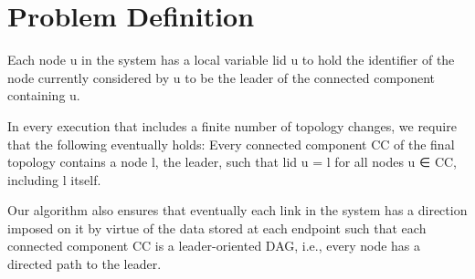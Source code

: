 \section{Problem Definition}
Each node u in the system has a local variable lid u to hold the identifier of the node currently considered by u to be the leader of the connected component containing u.

In every execution that includes a finite number of topology changes, we require that the following eventually holds:
Every connected component CC of the final topology contains a node l, the leader, such that lid u = l for all nodes u ∈ CC, including l itself.

Our algorithm also ensures that eventually each link in the system has a direction imposed on it by virtue of the data stored at each endpoint such that each connected component CC is a leader-oriented DAG, i.e., every node has a directed path to the leader.

